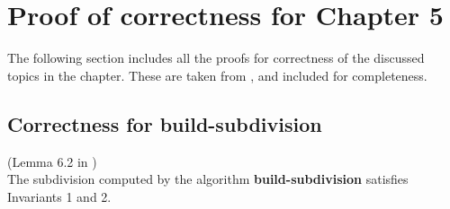 \chapter{Proof of correctness for Chapter 5}\label{appendix:proofs}

The following section includes all the proofs for correctness of the discussed topics in the chapter. These are taken from \cite{HershbergerS99}, and included for completeness.

\section{Correctness for \textbf{build-subdivision}}

\begin{Lemma} (Lemma 6.2 in \cite{HershbergerS99}) \\
The subdivision computed by the algorithm \textbf{build-subdivision} satisfies Invariants 1 and 2.
\end{Lemma}

